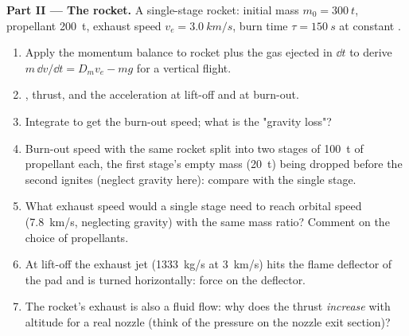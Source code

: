 \begin{problem}
\medskip
\noindent\textbf{Part II --- The rocket.}
A single-stage rocket: initial mass $m_0 = \qty{300}{t}$, propellant
\qty{200}{t}, exhaust speed $v_e = \qty{3.0}{km/s}$, burn time $\tau =
\qty{150}{s}$ at constant .
\begin{enumerate}[resume]
  \item Apply the momentum balance to rocket plus the gas ejected in
        $\dd t$ to derive $m\,\dd v/\dd t = D_mv_e - mg$ for a vertical
        flight.
  \item {}, thrust, and the acceleration at lift-off and
        at burn-out.
  \item Integrate to get the burn-out speed; what is the "gravity
        loss"?
  \item Burn-out speed with the same rocket split into two stages of
        \qty{100}{t} of propellant each, the first stage's empty mass
        (\qty{20}{t}) being dropped before the second ignites (neglect
        gravity here): compare with the single stage.
  \item What exhaust speed would a single stage need to reach orbital
        speed (\qty{7.8}{km/s}, neglecting gravity) with the same
        mass ratio? Comment on the choice of propellants.
  \item At lift-off the exhaust jet (\qty{1333}{kg/s} at \qty{3}{km/s}) hits
        the flame deflector of the pad and is turned horizontally:
        force on the deflector.
  \item The rocket's exhaust is also a fluid flow: why does the thrust
        \emph{increase} with altitude for a real nozzle (think of the
        pressure on the nozzle exit section)?
\end{enumerate}


\end{problem}
